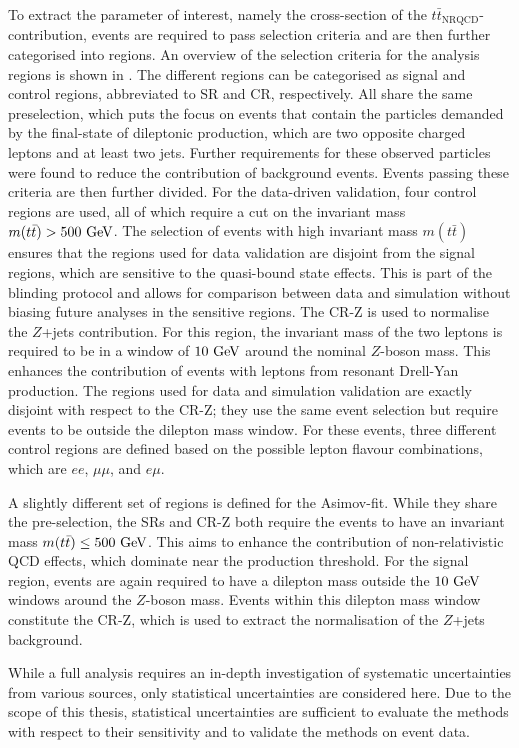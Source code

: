 To extract the parameter of interest, namely the cross-section of the ${t\bar{t}}_{\text{NRQCD}}$-contribution, events are required to pass selection criteria and are then further categorised into regions. An overview of the selection criteria for the analysis regions is shown in . The different regions can be categorised as signal and control regions, abbreviated to SR and CR, respectively. All share the same preselection, which puts the focus on events that contain the particles demanded by the final-state of dileptonic \ttbar production, which are two opposite charged leptons and at least two jets. Further requirements for these observed particles were found to reduce the contribution of background events. Events passing these criteria are then further divided.
For the data-driven validation, four control regions are used, all of which require a cut on the invariant mass $m(t\bar{t})>500~\GeV$. The selection of events with high invariant mass $m(t\bar{t})$ ensures that the regions used for data validation are disjoint from the signal regions, which are sensitive to the quasi-bound state effects. This is part of the blinding protocol and allows for comparison between data and simulation without biasing future analyses in the sensitive regions.
The CR-Z is used to normalise the $Z$+jets contribution.
For this region, the invariant mass of the two leptons is required to be in a window of $10~\GeV$ around the nominal $Z$-boson mass. This enhances the contribution of events with leptons from resonant Drell-Yan production.
The regions used for data and simulation validation are exactly disjoint with respect to the CR-Z; they use the same event selection but require events to be outside the dilepton mass window.
For these events, three different control regions are defined based on the possible lepton flavour combinations, which are $ee$, $\mu\mu$, and $e\mu$.

A slightly different set of regions is defined for the Asimov-fit.
While they share the pre-selection, the SRs and CR-Z both require the events to have an invariant mass $m(t\bar{t})\leq 500~\GeV$. This aims to enhance the contribution of non-relativistic QCD effects, which dominate near the production threshold. For the signal region, events are again required to have a dilepton mass outside the $10~\GeV$ windows around the $Z$-boson mass. Events within this dilepton mass window constitute the CR-Z, which is used to extract the normalisation of the $Z$+jets background.

While a full analysis requires an in-depth investigation of systematic uncertainties from various sources, only statistical uncertainties are considered here. Due to the scope of this thesis, statistical uncertainties are sufficient to evaluate the methods with respect to their sensitivity and to validate the methods on event data.

